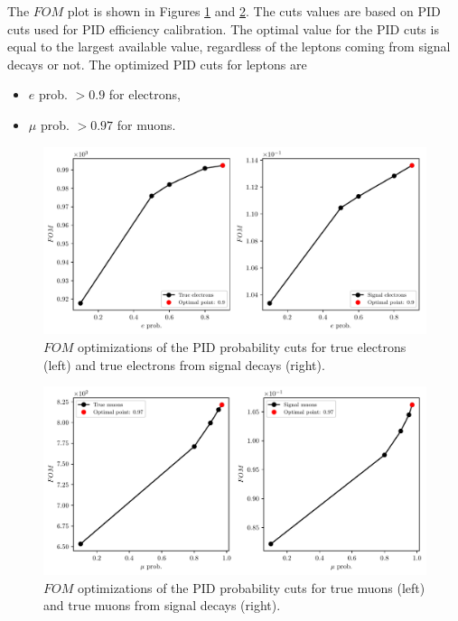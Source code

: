 \documentclass[oneside,a4paper,openany,12pt]{scrbook}
\begin{document}
The $FOM$ plot is shown in Figures \ref{fig:efom} and \ref{fig:mufom}. The cuts values are based on PID cuts used for PID efficiency calibration. The optimal value for the PID cuts is equal to the largest available value, regardless of the leptons coming from signal decays or not. The optimized PID cuts for leptons are
\begin{itemize}
\item $e$ prob. $ > 0.9$ for electrons,
\item $\mu$ prob. $ > 0.97$ for muons.
\end{itemize}

\begin{figure}[H]
\centering
\captionsetup{width=.8\linewidth}
\includegraphics[width=\linewidth]{fig/FSP_e_fom}
\caption{$FOM$ optimizations of the PID probability cuts for true electrons (left) and true electrons from signal decays (right).}
\label{fig:efom}
\end{figure}

\begin{figure}[H]
\centering
\captionsetup{width=.8\linewidth}
\includegraphics[width=\linewidth]{fig/FSP_mu_fom}
\caption{$FOM$ optimizations of the PID probability cuts for true muons (left) and true muons from signal decays (right).}
\label{fig:mufom}
\end{figure}
\end{document}
